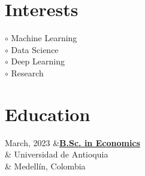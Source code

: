 \documentclass[a3paper,11pt]{article}
\begin{document}
\begin{adjustbox}{valign=t}
\begin{minipage}{0.3\textwidth}
\section*{Interests}
\raggedright
\textcolor{ColorOne}{$\circ$} Machine Learning\\
\textcolor{ColorOne}{$\circ$} Data Science\\
\textcolor{ColorOne}{$\circ$} Deep Learning\\
\textcolor{ColorOne}{$\circ$} Research

\vfill

\section*{Education}
\begin{tblr}{}
	\normalfont \textcolor{ColorOne}{March, 2023} &{\hypersetup{urlcolor=black}\href{https://github.com/AlRamirezRe/Resume-Documents/blob/master/ACTA-HV1152210514.pdf}{\textbf{B.Sc. in
Economics}}}  \\
        &  Universidad de Antioquia \\
        &  Medellín, Colombia\\
\end{tblr}


\vfill
\end{minipage}
\end{adjustbox}
\end{document}
